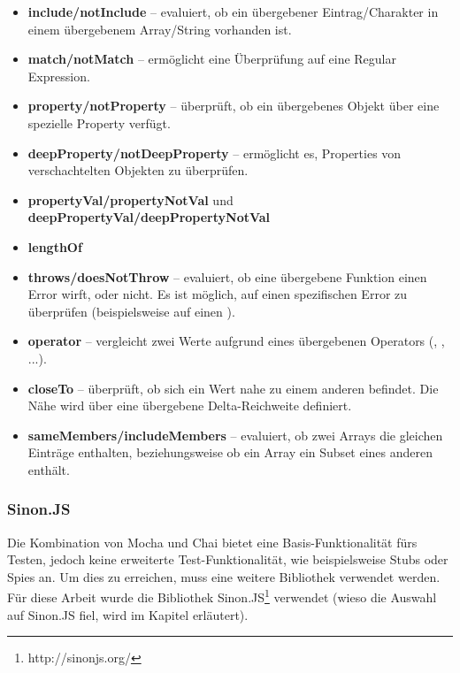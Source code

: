 \begin{itemize}
  \item \textbf{include/notInclude} -- evaluiert, ob ein übergebener Eintrag/Charakter in einem übergebenem Array/String vorhanden ist.
  
  \item \textbf{match/notMatch} -- ermöglicht eine Überprüfung auf eine Regular Expression.
  
  \item \textbf{property/notProperty} -- überprüft, ob ein übergebenes Objekt über eine spezielle Property verfügt.
  
  \item \textbf{deepProperty/notDeepProperty} -- ermöglicht es, Properties von verschachtelten Objekten zu überprüfen.
  
  \item \textbf{propertyVal/propertyNotVal} und \textbf{deepPropertyVal/deepPropertyNotVal}
  
  \item \textbf{lengthOf}
  
  \item \textbf{throws/doesNotThrow} -- evaluiert, ob eine übergebene Funktion einen Error wirft, oder nicht. Es ist möglich, auf einen spezifischen Error zu überprüfen (beispielsweise auf einen ).
  
  \item \textbf{operator} -- vergleicht zwei Werte aufgrund eines übergebenen Operators (\glqq{<\grqq}, \glqq{>\grqq}, ...).
  
  \item \textbf{closeTo} -- überprüft, ob sich ein Wert nahe zu einem anderen befindet. Die Nähe wird über eine übergebene Delta-Reichweite definiert.
  
  \item \textbf{sameMembers/includeMembers} -- evaluiert, ob zwei Arrays die gleichen Einträge enthalten, beziehungsweise ob ein Array ein Subset eines anderen enthält.
  
\end{itemize}

\subsubsection{Sinon.JS}
Die Kombination von Mocha und Chai bietet eine Basis-Funktionalität fürs Testen, jedoch keine erweiterte Test-Funktionalität, wie beispielsweise Stubs oder Spies an. Um dies zu erreichen, muss eine weitere Bibliothek verwendet werden. Für diese Arbeit wurde die Bibliothek Sinon.JS\footnote{http://sinonjs.org/} verwendet (wieso die Auswahl auf Sinon.JS fiel, wird im Kapitel  erläutert).


